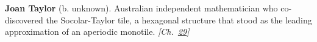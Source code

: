 \textbf{Joan Taylor} (b. unknown). Australian independent mathematician who co-discovered the Socolar-Taylor tile, a hexagonal structure that stood as the leading approximation of an aperiodic monotile. \emph{[Ch.~\hyperref[ch:hatmonotile]{29}]}

